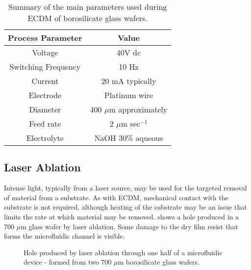 \begin{table}[!h]
	\centering
		\begin{tabular} { c c }
		\hline
			Process Parameter & Value \\		
		\hline
			Voltage & 40V dc\\
			Switching Frequency & 10 Hz \\
			Current & 20 mA typically \\
			Electrode & Platinum wire \\
			Diameter & 400 $\mu$m approximately \\
			Feed rate & 2 $\mu$m sec$^{-1}$ \\
			Electrolyte & NaOH 30\% aqueous\\
		\hline			
		\end{tabular}
	\caption{Summary of the main parameters used during ECDM of borosilicate glass wafers.}
	\label{tab:ECDM_parameters}
\end{table}

\subsection{Laser Ablation}
\label{Section:Laser_ablation}
Intense light, typically from a laser source, may be used for the targeted removal of material from a substrate. As with ECDM, mechanical contact with the substrate is not required, although heating of the substrate may be an issue that limits the rate at which material may be removed.  shows a hole produced in a 700 $\mu$m glass wafer by laser ablation. Some damage to the dry film resist that forms the microfluidic channel is visible.

\begin{figure}
\centering
{}
\caption[Hole drilled through glass substrate by laser ablation.]{Hole produced by laser ablation through one half of a microfluidic device - formed from two 700 $\mu$m borosilicate glass wafers.}
\label{fig:laser_drilling_holes}
\end{figure}

